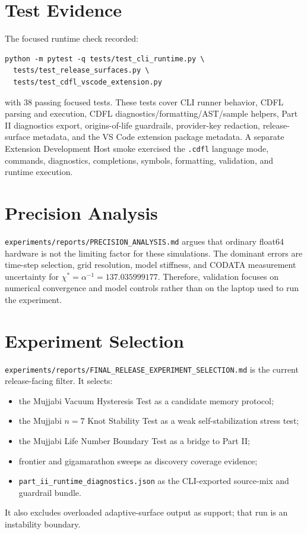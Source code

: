 \documentclass[12pt,a4paper]{article}
\begin{document}
\section{Test Evidence}
The focused runtime check recorded:
\begin{verbatim}
python -m pytest -q tests/test_cli_runtime.py \
  tests/test_release_surfaces.py \
  tests/test_cdfl_vscode_extension.py
\end{verbatim}
with 38 passing focused tests. These tests cover CLI runner behavior, CDFL
parsing and execution, CDFL diagnostics/formatting/AST/sample helpers, Part II
diagnostics export, origins-of-life guardrails, provider-key redaction,
release-surface metadata, and the VS Code extension package metadata. A
separate Extension Development Host smoke exercised the \texttt{.cdfl} language
mode, commands, diagnostics, completions, symbols, formatting, validation, and
runtime execution.

\section{Precision Analysis}
\texttt{experiments/reports/PRECISION\_ANALYSIS.md} argues that ordinary
float64 hardware is not the limiting factor for these simulations. The dominant
errors are time-step selection, grid resolution, model stiffness, and CODATA
measurement uncertainty for $\chi^*=\alpha^{-1}=137.035999177$. Therefore,
validation focuses on numerical convergence and model controls rather than
on the laptop used to run the experiment.

\section{Experiment Selection}
\texttt{experiments/reports/FINAL\_RELEASE\_EXPERIMENT\_SELECTION.md} is the
current release-facing filter. It selects:
\begin{itemize}
    \item the Mujjabi Vacuum Hysteresis Test as a candidate memory protocol;
    \item the Mujjabi \(n=7\) Knot Stability Test as a weak
    self-stabilization stress test;
    \item the Mujjabi Life Number Boundary Test as a bridge to Part II;
    \item frontier and gigamarathon sweeps as discovery coverage evidence;
    \item \texttt{part\_ii\_runtime\_diagnostics.json} as the CLI-exported
    source-mix and guardrail bundle.
\end{itemize}
It also excludes overloaded adaptive-surface output as support; that run is an
instability boundary.
\end{document}
